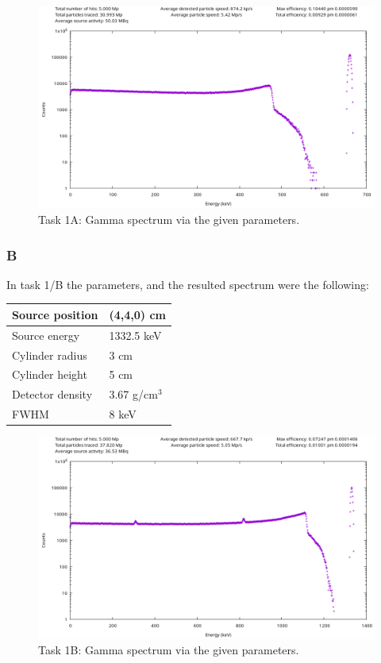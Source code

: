 \documentclass[a4paper,12pt]{article}
\begin{document}
\begin{figure}[h!]
\centering
\includegraphics[width=\textwidth]{./1A.png}
\caption{Task 1A: Gamma spectrum via the given parameters.}
\end{figure}

\subsubsection{B}
In task 1/B the parameters, and the resulted spectrum were the following:
\begin{table}[h!]
\centering
\begin{tabular}{|l|l|}
\hline
Source position & (4,4,0) cm \\ \hline
Source energy & 1332.5 keV \\ \hline
Cylinder radius & 3 cm \\ \hline
Cylinder height & 5 cm \\ \hline
Detector density & 3.67 g/cm$^3$ \\ \hline
FWHM & 8 keV \\ \hline
\end{tabular}
\end{table}

\begin{figure}[h!]
\centering
\includegraphics[width=\textwidth]{./1B.png}
\caption{Task 1B: Gamma spectrum via the given parameters.}
\end{figure}
\end{document}

